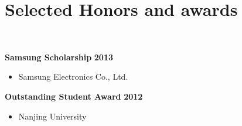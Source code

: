 \documentclass[11pt]{article}
\begin{document}
\vspace{0.8cm}





\vspace{0.8cm}

%


\section*{\sc Selected Honors and awards}~
\vspace{-.1in}

{\bf Samsung Scholarship}
\hfill
{\bf 2013}
\begin{itemize}
 \item[] Samsung Electronics Co., Ltd.
\end{itemize}

\vspace*{.1in}

{\bf Outstanding Student Award}
\hfill {\bf 2012}
\begin{itemize}
	\item[]  Nanjing University
\end{itemize}

\vspace{0.8cm}


\vspace{0.8cm}




\end{document}
